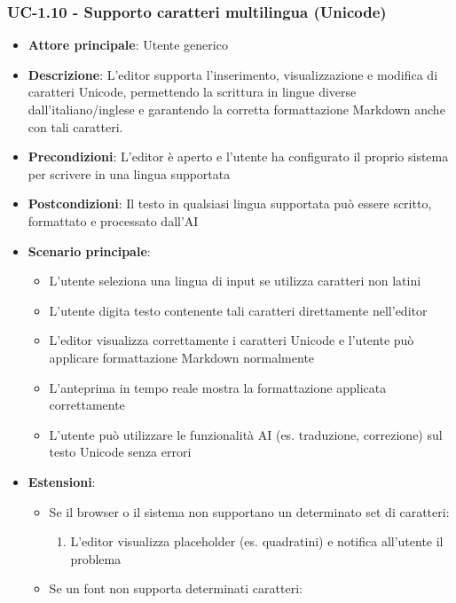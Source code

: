 \documentclass[11pt,a4paper]{article}
\begin{document}
\subsubsection{UC-1.10 - Supporto caratteri multilingua (Unicode)}
\begin{itemize}
    \item \textbf{Attore principale}: Utente generico
    \item \textbf{Descrizione}: L'editor supporta l'inserimento, visualizzazione e modifica di caratteri Unicode, permettendo la scrittura in lingue diverse dall'italiano/inglese e garantendo la corretta formattazione Markdown anche con tali caratteri.
    \item \textbf{Precondizioni}: L'editor è aperto e l'utente ha configurato il proprio sistema per scrivere in una lingua supportata
    \item \textbf{Postcondizioni}: Il testo in qualsiasi lingua supportata può essere scritto, formattato e processato dall'AI
    \item \textbf{Scenario principale}:
        \begin{itemize}
            \item L'utente seleziona una lingua di input se utilizza caratteri non latini
            \item L'utente digita testo contenente tali caratteri direttamente nell'editor
            \item L'editor visualizza correttamente i caratteri Unicode e l'utente può applicare formattazione Markdown normalmente
            \item L'anteprima in tempo reale mostra la formattazione applicata correttamente
            \item L'utente può utilizzare le funzionalità AI (es. traduzione, correzione) sul testo Unicode senza errori
        \end{itemize}
    \item \textbf{Estensioni}:
        \begin{itemize}
            \item Se il browser o il sistema non supportano un determinato set di caratteri:
                \begin{enumerate}
                    \item L'editor visualizza placeholder (es. quadratini) e notifica all'utente il problema
                \end{enumerate}
            \item Se un font non supporta determinati caratteri:

\end{itemize}
\end{itemize}
\end{document}
